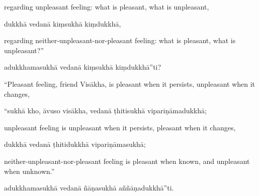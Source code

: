 \begin{samepage}
\begin{leftcolumn*}
regarding unpleasant feeling: what is pleasant, what is unpleasant,
\end{leftcolumn*}

\begin{rightcolumn}
dukkhā vedanā kiṃsukhā kiṃdukkhā,
\end{rightcolumn}
\end{samepage}

\begin{samepage}
\begin{leftcolumn*}
regarding neither-unpleasant-nor-pleasant feeling: what is pleasant, what is unpleasant?”
\end{leftcolumn*}

\begin{rightcolumn}
adukkhamasukhā vedanā kiṃsukhā kiṃdukkhā”ti?
\end{rightcolumn}
\end{samepage}

\begin{samepage}
\begin{leftcolumn*}
“Pleasant feeling, friend Visākha, is pleasant when it persists, unpleasant when it changes,
\end{leftcolumn*}

\begin{rightcolumn}
“sukhā kho, āvuso visākha, vedanā ṭhitisukhā vipariṇāmadukkhā;
\end{rightcolumn}
\end{samepage}

\begin{samepage}
\begin{leftcolumn*}
unpleasant feeling is unpleasant when it persists, pleasant when it changes,
\end{leftcolumn*}

\begin{rightcolumn}
dukkhā vedanā ṭhitidukkhā vipariṇāmasukhā;
\end{rightcolumn}
\end{samepage}

\begin{samepage}
\begin{leftcolumn*}
neither-unpleasant-nor-pleasant feeling is pleasant when known, and unpleasant when unknown.”
\end{leftcolumn*}

\begin{rightcolumn}
adukkhamasukhā vedanā ñāṇasukhā aññāṇadukkhā”ti.
\end{rightcolumn}
\end{samepage}

